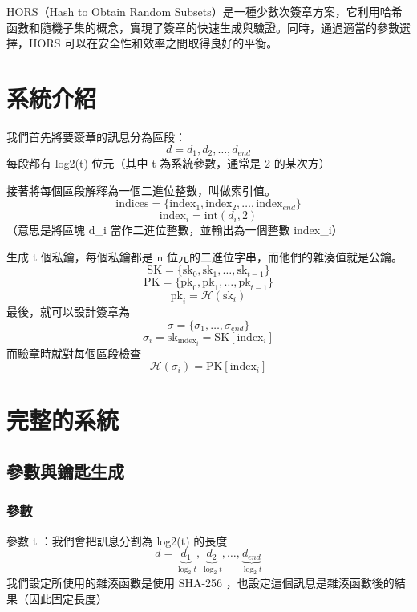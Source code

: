 \documentclass[
]{article}
\author{}
\date{}
\begin{document}
HORS（Hash to Obtain Random
Subsets）是一種少數次簽章方案，它利用哈希函數和隨機子集的概念，實現了簽章的快速生成與驗證。同時，通過適當的參數選擇，HORS
可以在安全性和效率之間取得良好的平衡。

\hypertarget{ux7cfbux7d71ux4ecbux7d39}{%
\section{系統介紹}\label{ux7cfbux7d71ux4ecbux7d39}}

我們首先將要簽章的訊息分為區段： \[
d = d_{1},d_{2},\dots,d_{end}
\] 每段都有 log2(t) 位元（其中 t 為系統參數，通常是 2 的某次方）

接著將每個區段解釋為一個二進位整數，叫做索引值。 \[
\mathrm{indices} = \{ \mathrm{index}_{1},\mathrm{index}_{2},\dots, \mathrm{index}_{end}\}
\] \[
\mathrm{index}_{i} = \mathrm{int}(d_{i},2)
\] （意思是將區塊 d\_i 當作二進位整數，並輸出為一個整數 index\_i）

生成 t 個私鑰，每個私鑰都是 n 位元的二進位字串，而他們的雜湊值就是公鑰。
\[
\mathrm{SK}=\{\mathrm{sk}_{0},\mathrm{sk}_{1},\dots,\mathrm{sk}_{t-1}\}
\]\[
\mathrm{PK}=\{\mathrm{pk}_{0},\mathrm{pk}_{1},\dots,\mathrm{pk}_{t-1}\}
\] \[
\mathrm{pk}_{i}= \mathcal{H}(\mathrm{sk}_{i})
\] 最後，就可以設計簽章為 \[
\sigma 
= \{\sigma_{1},\dots,\sigma_{end}\}
\] \[
\sigma_{i} = \mathrm{sk}_{\mathrm{index}_{i}} = \mathrm{SK}[\mathrm{index}_{i}]
\] 而驗章時就對每個區段檢查 \[
\mathcal{H}(\sigma_{i}) = \mathrm{PK}[\mathrm{index}_{i}]
\]

\hypertarget{ux5b8cux6574ux7684ux7cfbux7d71}{%
\section{完整的系統}\label{ux5b8cux6574ux7684ux7cfbux7d71}}

\hypertarget{ux53c3ux6578ux8207ux9470ux5319ux751fux6210}{%
\subsection{參數與鑰匙生成}\label{ux53c3ux6578ux8207ux9470ux5319ux751fux6210}}

\hypertarget{ux53c3ux6578}{%
\subsubsection{參數}\label{ux53c3ux6578}}

參數 t ：我們會把訊息分割為 log2(t) 的長度 \[
d = \underbrace{ d_{1} }_{ \log_{2}t },\underbrace{ d_{2} }_{ \log_{2}t},\dots,\underbrace{ d_{end} }_{ \log_{2}t}
\] 我們設定所使用的雜湊函數是使用 SHA-256
，也設定這個訊息是雜湊函數後的結果（因此固定長度）
\end{document}
